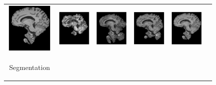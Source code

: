 \documentclass[review]{elsarticle}
\begin{document}
\begin{figure}[H]
\begin{raggedleft}
\begin{tabular}{cccccc}
			\includegraphics[width=2.5cm,height=2.5cm]{include/grp2/factor6/022-Guys-0701-T1/022-Guys-0701-T1_brains__50} &
			\includegraphics[width=2.5cm,height=2.5cm]{include/grp2/factor6/022-Guys-0701-T1/022-Guys-0701-T1_brains__zeroPadding_50} & \includegraphics[width=2.5cm,height=2.5cm]{include/grp2/factor6/022-Guys-0701-T1/022-Guys-0701-T1_brains__CS_50} & \includegraphics[width=2.5cm,height=2.5cm]{include/grp2/factor6/022-Guys-0701-T1/022-Guys-0701-T1_brains__IMCNNL2TUNE_50} & \includegraphics[width=2.5cm,height=2.5cm]{include/grp2/factor6/022-Guys-0701-T1/022-Guys-0701-T1_brains__predict_50}
			
			\tabularnewline
			
			\multirow{2}{0.05cm}[1.7cm]{\begin{turn}{90} {\footnotesize Segmentation} \end{turn}} &
			

\end{tabular}
\end{raggedleft}
\end{figure}
\end{document}
